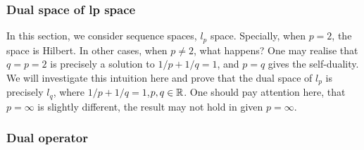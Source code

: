 \subsubsection{Dual space of lp space}\label{lp dual}
In this section, we consider sequence spaces, $l_p$ space. Specially, when $p=2$, the space is Hilbert. In other cases,  when $p\not=2$, what happens? One may realise that $q=p=2$ is precisely a solution to $1/p+1/q=1$, and $p=q$ gives the self-duality. We will investigate this intuition here and prove that the dual space of $l_p$ is precisely $l_q$, where $1/p+1/q=1$,$p,q\in\mathbb{R}$. One should pay attention here, that $p=\infty$ is slightly different, the result may not hold in given $p=\infty$.

\begin{theorem}\rm\nextline
    
\end{theorem}


\subsubsection{Dual operator}\label{dual operator}
